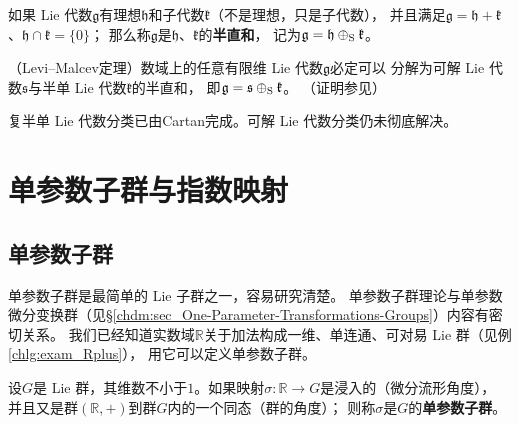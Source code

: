 \begin{definition}
    如果 Lie 代数$\mathfrak{g}$有理想$\mathfrak{h}$和子代数$\mathfrak{k}$（不是理想，只是子代数），
    并且满足$\mathfrak{g}=\mathfrak{h}+\mathfrak{k}$、$\mathfrak{h}\cap\mathfrak{k}=\{0\}$；
    那么称$\mathfrak{g}$是$\mathfrak{h}$、$\mathfrak{k}$的\textbf{半直和}，
    记为$\mathfrak{g}=\mathfrak{h}\oplus_{\rm S}\mathfrak{k}$。
\end{definition}



\begin{theorem}\label{chlg:thm_Levi-Malcev}
    （Levi--Malcev定理）数域上的任意有限维 Lie 代数$\mathfrak{g}$必定可以
    分解为可解 Lie 代数$\mathfrak{s}$与半单 Lie 代数$\mathfrak{k}$的半直和，
    即$\mathfrak{g}=\mathfrak{s}\oplus_{\rm S}\mathfrak{k}$。
    （证明参见\parencite[\S 5.6]{Hilgert-2012}）
\end{theorem}

复半单 Lie 代数分类已由Cartan完成。可解 Lie 代数分类仍未彻底解决。








\section{单参数子群与指数映射}
\subsection{单参数子群}\label{chlg:sec_1psg}
单参数子群是最简单的 Lie 子群之一，容易研究清楚。
单参数子群理论与单参数微分变换群（见\S\ref{chdm:sec_One-Parameter-Transformations-Groups}）内容有密切关系。
我们已经知道实数域$\mathbb{R}$关于加法构成一维、单连通、可对易 Lie 群（见例\ref{chlg:exam_Rplus}），
用它可以定义单参数子群。
\begin{definition}
    设$G$是 Lie 群，其维数不小于$1$。如果映射$\sigma:\mathbb{R}\to G$是浸入的（微分流形角度），
    并且又是群$(\mathbb{R},+)$到群$G$内的一个同态（群的角度）；
    则称$\sigma$是$G$的\textbf{单参数子群}。
\end{definition}


